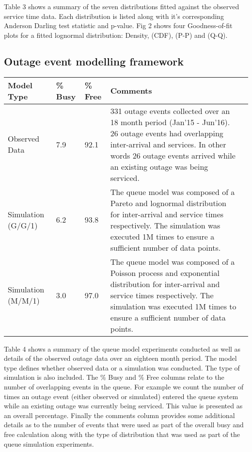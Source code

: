 \documentclass[5p]{elsarticle}
\begin{document}
Table 3 shows a summary of the seven distributions fitted against the observed service time data. Each distribution is listed along with it's corresponding Anderson Darling test statistic and p-value. Fig 2 shows four Goodness-of-fit plots for a fitted lognormal distribution: Density, (CDF), (P-P)  and (Q-Q).  


\subsection{Outage event modelling framework}

\begin {table*}[]
\caption {Summary of queue modelling experiments and observed overlapping outage events} 
\begin{flushleft}

\begin{tabular}{l | l | l | p{10cm} l} \bf{Model Type} & \bf {\% Busy} & \bf {\% Free} & \bf {Comments} 
\\ \hline Observed Data & 7.9 &  92.1 & 331 outage events collected over an 18 month period (Jan'15 - Jun'16). 26 outage events had overlapping inter-arrival and services. In other words 26 outage events arrived while an existing outage was being serviced. 

\\  Simulation (G/G/1) & 6.2 &  93.8 &  The queue model was composed of a Pareto and lognormal distribution for inter-arrival and service times respectively. The simulation was executed 1M times to ensure a sufficient number of data points.

\\  Simulation (M/M/1) & 3.0  &  97.0 &  The queue model was composed of a Poisson process and exponential distribution for inter-arrival and service times respectively. The simulation was executed 1M times to ensure a sufficient number of data points.
\\ \hline 

 \end{tabular}
\end{flushleft}
\end{table*}

Table 4 shows a summary of the queue model experiments conducted as well as details of the observed outage data over an eighteen month period. The model type defines whether observed data or a simulation was conducted. The type of simulation is also included. The \% Busy and \% Free columns relate to the number of overlapping events in the queue. For example we count the number of times an outage event (either observed or simulated) entered the queue system while an existing outage was currently being serviced. This value is presented as an overall percentage. Finally the comments column provides some additional details as to the number of events that were used as part of the overall busy and free calculation along with the type of distribution that was used as part of the queue simulation experiments. 
\end{document}
